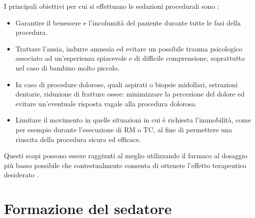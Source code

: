 I principali obiettivi per cui si effettuano le sedazioni procedurali sono \cite{Uptodatesed}: 

\begin{itemize}
    \item Garantire il benessere e l'incolumità del paziente durante tutte le fasi della procedura.
    \item Trattare l'ansia, indurre amnesia ed evitare un possibile trauma psicologico associato ad un'esperienza spiacevole e di difficile comprensione, soprattutto nel caso di bambino molto piccolo.
    \item In caso di procedure dolorose, quali aspirati o biopsie midollari, estrazioni dentarie, riduzione di fratture ossee: minimizzare la percezione del dolore ed evitare un'eventuale risposta vagale alla procedura dolorosa.
    \item Limitare il movimento in quelle situazioni in cui è richiesta l'immobilità, come per esempio durante l'esecuzione di RM o TC, al fine di permettere una riuscita della procedura sicura ed efficace.

\end{itemize}

Questi scopi possono essere raggiunti al meglio utilizzando il farmaco al dosaggio più basso possibile che contestualmente consenta di ottenere l'effetto terapeutico desiderato \cite{Guidelines2019}.

\section{Formazione del sedatore}

